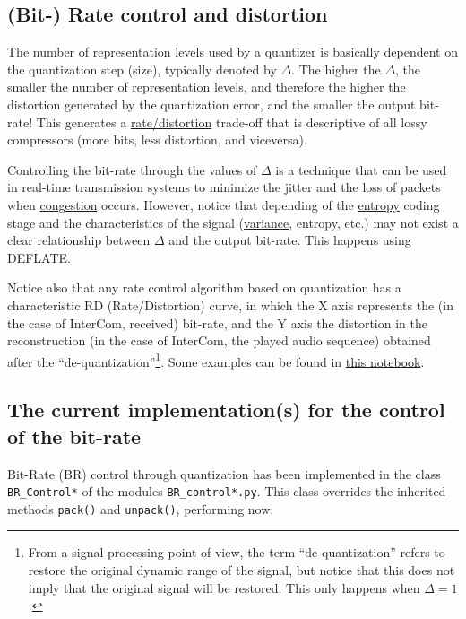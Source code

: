 
\subsection{(Bit-) Rate control and distortion}
The number of representation levels used by a quantizer is basically
dependent on the quantization step (size), typically denoted by
$\Delta$. The higher the $\Delta$, the smaller the number of
representation levels, and therefore the higher the distortion
generated by the quantization error, and the smaller the output
bit-rate! This generates a
\href{https://en.wikipedia.org/wiki/Rate%E2%80%93distortion_theory}{rate/distortion}
  trade-off that is descriptive of all lossy compressors (more bits, less distortion, and viceversa).

Controlling the bit-rate through the values of $\Delta$ is a technique
that can be used in real-time transmission systems to minimize the
jitter and the loss of packets when
\href{https://en.wikipedia.org/wiki/Network_congestion}{congestion}
occurs. However, notice that depending of the
\href{https://en.wikipedia.org/wiki/Entropy_(information_theory)}{entropy}
coding stage and the characteristics of the signal
(\href{https://en.wikipedia.org/wiki/Variance}{variance}, entropy, etc.) may
not exist a clear relationship between $\Delta$ and the output
bit-rate. This happens using DEFLATE.

Notice also that any rate control algorithm based on quantization has
a characteristic RD (Rate/Distortion) curve, in which the X axis
represents the (in the case of InterCom, received) bit-rate, and the Y
axis the distortion in the reconstruction (in the case of InterCom,
the played audio sequence) obtained after the
``de-quantization''\footnote{From a signal processing point of view,
  the term ``de-quantization'' refers to restore the original dynamic
  range of the signal, but notice that this does not imply that the
  original signal will be restored. This only happens when
  $\Delta=1$.}. Some examples can be found in
\href{https://github.com/Tecnologias-multimedia/Tecnologias-multimedia.github.io/blob/master/contents/BR_control/audio_quantization.ipynb}{this
  notebook}.

\subsection{The current implementation(s) for the control of the bit-rate}
Bit-Rate (BR) control through quantization has been implemented in the
class \verb|BR_Control*| of the modules \texttt{BR\_control*.py}. This
class overrides the inherited methods \verb|pack()| and
\verb|unpack()|, performing now:

